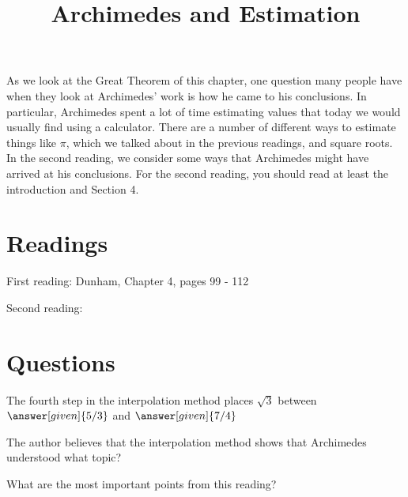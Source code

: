 \documentclass[nooutcomes]{ximera}
\title{Archimedes and Estimation}
\begin{document}
\begin{abstract}
    
\end{abstract}
\maketitle

As we look at the Great Theorem of this chapter, one question many people have when they look at Archimedes' work is how he came to his conclusions.  In particular, Archimedes spent a lot of time estimating values that today we would usually find using a calculator.  There are a number of different ways to estimate things like $\pi$, which we talked about in the previous readings, and square roots.  In the second reading, we consider some ways that Archimedes might have arrived at his conclusions.  For the second reading, you should read at least the introduction and Section 4.


\section{Readings}
First reading: Dunham, Chapter 4, pages 99 - 112

Second reading: 

\section{Questions}

\begin{question}
The fourth step in the interpolation method places $\sqrt{3}$ between $\answer[given]{5/3}$ and $\answer[given]{7/4}$
\end{question}

\begin{question}
The author believes that the interpolation method shows that Archimedes understood what topic?
\begin{multipleChoice}
\end{multipleChoice}
\end{question}


\begin{question}
What are the most important points from this reading?
\begin{freeResponse}
\end{freeResponse}

\end{question}
\end{document}
